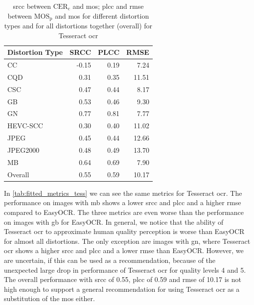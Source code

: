 \begin{table}[h!]
    \centering
    \begin{tabular}{|l|rrr|}
        \hline
        Distortion Type & SRCC & PLCC & RMSE \\
        \hline
        \hline
        CC & -0.15 & 0.19 & 7.24 \\
        CQD & 0.31 & 0.35 & 11.51 \\
        CSC & 0.47 & 0.44 & 8.17 \\
        GB & 0.53 & 0.46 & 9.30 \\
        GN & 0.77 & 0.81 & 7.77 \\
        HEVC-SCC & 0.30 & 0.40 & 11.02 \\
        JPEG & 0.45 & 0.44 & 12.66 \\
        JPEG2000 & 0.48 & 0.49 & 13.70 \\
        MB & 0.64 & 0.69 & 7.90 \\
        \hline
        Overall & 0.55 & 0.59 & 10.17 \\
        \hline
    \end{tabular}
    \caption{\gls{srcc} between $\text{CER}_{\text{c}}$ and \gls{mos}; \gls{plcc} and \gls{rmse} between $\text{MOS}_{\text{p}}$ and \gls{mos} for different distortion types and for all distortions together (overall) for Tesseract \gls{ocr}}
    \label{tab:fitted_metrics_tess}
\end{table}

In \autoref{tab:fitted_metrics_tess} we can see the same metrics for Tesseract \gls{ocr}.
The performance on images with \gls{mb} shows a lower \gls{srcc} and \gls{plcc} and a higher \gls{rmse} compared to EasyOCR.
The three metrics are even worse than the performance on images with \gls{gb} for EasyOCR.
In general, we notice that the ability of Tesseract \gls{ocr} to approximate human quality perception is worse than EasyOCR for almost all distortions.
The only exception are images with \gls{gn}, where Tesseract \gls{ocr} shows a higher \gls{srcc} and \gls{plcc} and a lower \gls{rmse} than EasyOCR.
However, we are uncertain, if this can be used as a recommendation, because of the unexpected large drop in performance of Tesseract \gls{ocr} for quality levels 4 and 5.
The overall performance with \gls{srcc} of 0.55, \gls{plcc} of 0.59 and \gls{rmse} of 10.17 is not high enough to support a general recommendation for using Tesseract \gls{ocr} as a substitution of the \gls{mos} either.

